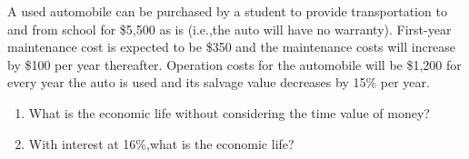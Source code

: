 \begin{exercises}
    \begin{exercise}
    \label{sea-9-10}
        A used automobile can be purchased by a student to provide transportation to and from school for \$5,500 as is (i.e.,the auto will have no warranty). First-year maintenance cost is expected to be \$350 and the maintenance costs will increase by \$100 per year thereafter. Operation costs for the automobile will be \$1,200 for every year the auto is used and its salvage value decreases by 15\% per year.
        \begin{enumerate}[label=\alph*)]
            \item What is the economic life without considering the time value of money?
            \item With interest at 16\%,what is the economic life?
        \end{enumerate}
    \end{exercise}
    \begin{solution}
    \end{solution}
    
    

\end{exercises}



\begin{exercises}
    \begin{exercise}
    \label{sea-10-1}
    
    \end{exercise}
    \begin{solution}
    \end{solution}

\end{exercises}



\begin{exercises}
    \begin{exercise}
    \label{sea-11-1}
    
    \end{exercise}
    \begin{solution}
    \end{solution}

\end{exercises}

